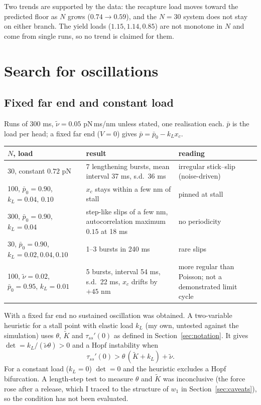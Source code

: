\documentclass[11pt,a4paper]{article}
\begin{document}
Two trends are supported by the data: the recapture load moves toward the predicted floor as $N$ grows ($0.74\to0.59$), and the $N=30$ system does not stay on either branch. The yield loads ($1.15,1.14,0.85$) are not monotone in $N$ and come from single runs, so no trend is claimed for them.

\section{Search for oscillations}
\label{sec:osc}

\subsection{Fixed far end and constant load}
Runs of 300 ms, $\tilde\nu=0.05$ pN\,ms/nm unless stated, one realisation each. $\bar p$ is the load per head; a fixed far end ($V=0$) gives $\bar p=\bar p_0-k_Lx_c$.
\begin{center}
\begin{tabular}{p{4.3cm}p{5.2cm}p{5.0cm}}
\toprule
$N$, load & result & reading \\
\midrule
30, constant $0.72$ pN & 7 lengthening bursts, mean interval 37 ms, s.d.\ 36 ms & irregular stick--slip (noise-driven) \\
100, $\bar p_0=0.90$, $k_L=0.04,\,0.10$ & $x_c$ stays within a few nm of stall & pinned at stall \\
300, $\bar p_0=0.90$, $k_L=0.04$ & step-like slips of a few nm, autocorrelation maximum $0.15$ at 18 ms & no periodicity \\
30, $\bar p_0=0.90$, $k_L=0.02,0.04,0.10$ & 1--3 bursts in 240 ms & rare slips \\
100, $\tilde\nu=0.02$, $\bar p_0=0.95$, $k_L=0.01$ & 5 bursts, interval 54 ms, s.d.\ 22 ms, $x_c$ drifts by $+45$ nm & more regular than Poisson; not a demonstrated limit cycle \\
\bottomrule
\end{tabular}
\end{center}
With a fixed far end no sustained oscillation was obtained. A two-variable heuristic for a stall point with elastic load $k_L$ (my own, untested against the simulation) uses $\theta$, $\tilde K$ and $\tau_{ss}'(0)$ as defined in Section~\ref{sec:notation}. It gives $\det=k_L/(\tilde\nu\theta)>0$ and a Hopf instability when
\begin{equation}
\tau_{ss}'(0)>\theta\,(\tilde K+k_L)+\tilde\nu .
\end{equation}
For a constant load ($k_L=0$) $\det=0$ and the heuristic excludes a Hopf bifurcation. A length-step test to measure $\theta$ and $\tilde K$ was inconclusive (the force rose after a release, which I traced to the structure of $w_1$ in Section~\ref{sec:caveats}), so the condition has not been evaluated.
\end{document}
